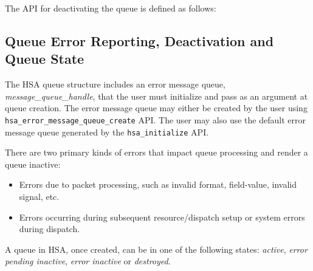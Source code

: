 The API for deactivating the queue is defined as follows:



\hypertarget{queue_errors}{}\subsection{Queue Error Reporting,
Deactivation and Queue State} \label{queueerrors}
The HSA queue structure includes an error message queue, {\itshape
message\_queue\_handle}, that the user must initialize and pass as
an argument at queue creation. The error message queue may either be
created by the user using
\texttt{hsa\_error\_message\_queue\_create} API. The user may also
use the default error message queue generated by the
\texttt{hsa\_initialize} API.

There are two primary kinds of errors that impact queue
processing and render a queue inactive:
\begin{itemize}
        \item Errors due to packet processing, such as invalid
                format, field-value, invalid signal, etc.
        \item Errors occurring during subsequent resource/dispatch
                setup or system errors during dispatch.
\end{itemize}

A queue in HSA, once created, can be in one of the following states:
\emph{active}, \emph{error pending inactive}, \emph{error inactive}
or \emph{destroyed}.

